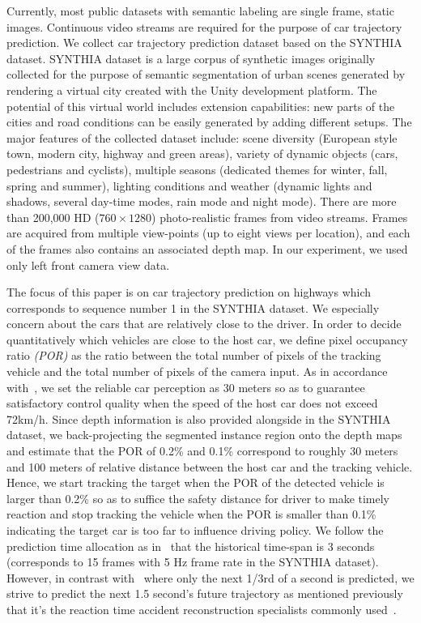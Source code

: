 \documentclass[10pt,twocolumn,letterpaper]{article}
\begin{document}
Currently, most public datasets with semantic labeling are single frame, static images. Continuous video streams are required for the purpose of car trajectory prediction.
We collect car trajectory prediction dataset based on the SYNTHIA~\cite{ros2016synthia} dataset.
SYNTHIA dataset is a large corpus of synthetic images originally collected for the purpose of semantic segmentation of urban scenes generated by rendering a virtual city created with the Unity development platform.
The potential of this virtual world includes extension capabilities: new parts of the cities and road conditions can be easily generated by adding different setups. The major features of the collected dataset include: scene diversity (European style town, modern city, highway and green areas), variety of dynamic objects (cars, pedestrians and cyclists), multiple seasons (dedicated themes for winter, fall, spring and summer), lighting conditions and weather (dynamic lights and shadows, several day-time modes, rain mode and night mode).
There are more than 200,000 HD ($760\times1280$) photo-realistic frames from video streams.
Frames are acquired from multiple view-points (up to eight views per location), and each of the frames also contains an associated depth map. In our experiment, we used only left front camera view data.

The focus of this paper is on car trajectory prediction on highways which corresponds to sequence number 1 in the SYNTHIA dataset. We especially concern about the cars that are relatively close to the driver.
In order to decide quantitatively which vehicles are close to the host car, we define pixel occupancy ratio \emph{(POR)} as the ratio between the total number of pixels of the tracking vehicle and the total number of pixels of the camera input.
As in accordance with~\cite{chen2015deepdriving}, we set the reliable car perception as 30 meters so as to guarantee satisfactory control quality when the speed of the host car does not exceed 72km/h.
Since depth information is also provided alongside in the SYNTHIA dataset, we back-projecting the segmented instance region onto the depth maps and estimate that the POR of 0.2\% and 0.1\% correspond to roughly 30 meters and 100 meters of relative distance between the host car and the tracking vehicle.
Hence, we start tracking the target when the POR of the detected vehicle is larger than 0.2\%  so as to suffice the safety distance for driver to make timely reaction and stop tracking the vehicle when the POR is smaller than 0.1\% indicating the target car is too far to influence driving policy.
We follow the prediction time allocation as in~\cite{xu2017end} that the historical time-span is 3 seconds (corresponds to 15 frames with 5 Hz frame rate in the SYNTHIA dataset).
However, in contrast with~\cite{xu2017end} where only the next 1/3rd of a second is predicted, we strive to predict the next 1.5 second's future trajectory as mentioned previously that it's the reaction time accident reconstruction specialists commonly used~\cite{mcgehee2000driver}.
\end{document}
